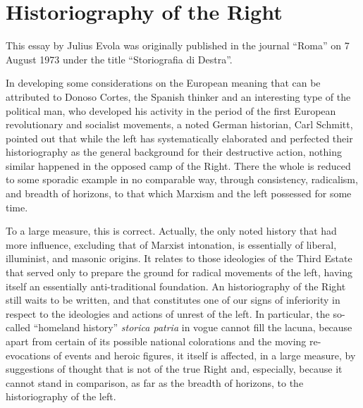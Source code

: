 \section{Historiography of the Right}

\begin{quotex}
This essay by Julius Evola was originally published in the journal ``Roma'' on 7 August 1973 under the title ``Storiografia di Destra''.
\end{quotex}

In developing some considerations on the European meaning that can be attributed to Donoso Cortes, the Spanish thinker and an interesting type of the political man, who developed his activity in the period of the first European revolutionary and socialist movements, a noted German historian, Carl Schmitt, pointed out that while the left has systematically elaborated and perfected their historiography as the general background for their destructive action, nothing similar happened in the opposed camp of the Right. There the whole is reduced to some sporadic example in no comparable way, through consistency, radicalism, and breadth of horizons, to that which Marxism and the left possessed for some time.

To a large measure, this is correct. Actually, the only noted history that had more influence, excluding that of Marxist intonation, is essentially of liberal, illuminist, and masonic origins. It relates to those ideologies of the Third Estate that served only to prepare the ground for radical movements of the left, having itself an essentially anti-traditional foundation. An historiography of the Right still waits to be written, and that constitutes one of our signs of inferiority in respect to the ideologies and actions of unrest of the left. In particular, the so-called ``homeland history'' \emph{storica patria} in vogue cannot fill the lacuna, because apart from certain of its possible national colorations and the moving re-evocations of events and heroic figures, it itself is affected, in a large measure, by suggestions of thought that is not of the true Right and, especially, because it cannot stand in comparison, as far as the breadth of horizons, to the historiography of the left.


